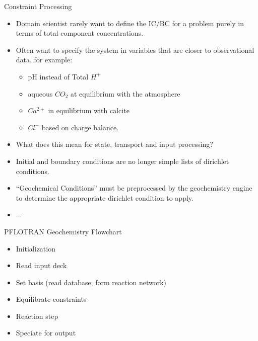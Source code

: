 \documentclass{beamer}
\newcommand{\pft}{PFLOTRAN\xspace}
\begin{document}
\begin{frame}{Constraint Processing}
\begin{itemize}
\item Domain scientist rarely want to define the IC/BC for a problem
  purely in terms of total component concentrations.
\item Often want to specify the system in variables that are
  closer to observational data. for example:
  \begin{itemize}
    \item pH instead of Total $H^+$
    \item aqueous $CO_2$ at equilibrium with the atmosphere
    \item $Ca^{2+}$ in equilibrium with calcite
    \item $Cl^-$ based on charge balance.
  \end{itemize}
\item What does this mean for state, transport and input processing?
\item Initial and boundary conditions are no longer simple lists of
  dirichlet conditions.
\item ``Geochemical Conditions'' must be preprocessed by the
  geochemistry engine to determine the appropriate dirichlet condition
  to apply.
\item ...
\end{itemize}
\end{frame}

\begin{frame}{\pft Geochemistry Flowchart}
\begin{itemize}
\item Initialization
\item Read input deck
\item Set basis (read database, form reaction network)
\item Equilibrate constraints
\item Reaction step
\item Speciate for output
\end{itemize}
\end{frame}
\end{document}
